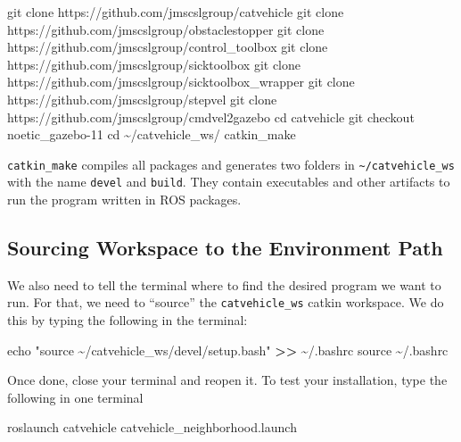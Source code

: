 \documentclass[
]{article}
\newenvironment{Shaded}{\begin{snugshade}}{\end{snugshade}}
\newcommand{\BuiltInTok}[1]{#1}
\newcommand{\ExtensionTok}[1]{#1}
\newcommand{\FunctionTok}[1]{\textcolor[rgb]{0.00,0.00,0.00}{#1}}
\newcommand{\NormalTok}[1]{#1}
\newcommand{\OperatorTok}[1]{\textcolor[rgb]{0.81,0.36,0.00}{\textbf{#1}}}
\newcommand{\StringTok}[1]{\textcolor[rgb]{0.31,0.60,0.02}{#1}}
\begin{document}
\begin{Shaded}
\begin{Highlighting}[]
\FunctionTok{git}\NormalTok{ clone https://github.com/jmscslgroup/catvehicle}
\FunctionTok{git}\NormalTok{ clone https://github.com/jmscslgroup/obstaclestopper}
\FunctionTok{git}\NormalTok{ clone https://github.com/jmscslgroup/control\_toolbox}
\FunctionTok{git}\NormalTok{ clone https://github.com/jmscslgroup/sicktoolbox}
\FunctionTok{git}\NormalTok{ clone https://github.com/jmscslgroup/sicktoolbox\_wrapper}
\FunctionTok{git}\NormalTok{ clone https://github.com/jmscslgroup/stepvel}
\FunctionTok{git}\NormalTok{ clone https://github.com/jmscslgroup/cmdvel2gazebo}
\BuiltInTok{cd}\NormalTok{ catvehicle}
\FunctionTok{git}\NormalTok{ checkout noetic\_gazebo{-}11}
\BuiltInTok{cd}\NormalTok{ \textasciitilde{}/catvehicle\_ws/}
\ExtensionTok{catkin\_make}
\end{Highlighting}
\end{Shaded}

\texttt{catkin\_make} compiles all packages and generates two folders in
\texttt{\textasciitilde{}/catvehicle\_ws} with the name \texttt{devel}
and \texttt{build}. They contain executables and other artifacts to run
the program written in ROS packages.

\hypertarget{sourcing-workspace-to-the-environment-path}{%
\subsection{Sourcing Workspace to the Environment
Path}\label{sourcing-workspace-to-the-environment-path}}

We also need to tell the terminal where to find the desired program we
want to run. For that, we need to ``source'' the \texttt{catvehicle\_ws}
catkin workspace. We do this by typing the following in the terminal:

\begin{Shaded}
\begin{Highlighting}[]
\BuiltInTok{echo} \StringTok{"source \textasciitilde{}/catvehicle\_ws/devel/setup.bash"} \OperatorTok{\textgreater{}\textgreater{}}\NormalTok{ \textasciitilde{}/.bashrc}
\BuiltInTok{source}\NormalTok{ \textasciitilde{}/.bashrc}
\end{Highlighting}
\end{Shaded}

Once done, close your terminal and reopen it. To test your installation,
type the following in one terminal

\begin{Shaded}
\begin{Highlighting}[]
\ExtensionTok{roslaunch}\NormalTok{ catvehicle catvehicle\_neighborhood.launch}
\end{Highlighting}
\end{Shaded}
\end{document}
